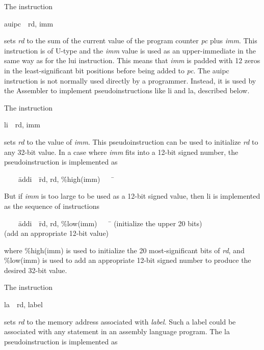 \documentclass[11pt, twoside, pdftex]{article}
\newenvironment{ctabbing}%
{\begin{center}\begin{minipage}{\textwidth}\begin{tabbing}}
{\end{tabbing}\end{minipage}\end{center}}
\begin{document}
The instruction
\vspace{-\baselineskip}
\begin{center}
{\sf auipc~~rd, imm}
\end{center}
\noindent
sets {\it rd} to the sum of the current value of the program counter {\it pc} plus {\it imm}. 
This instruction is of U-type and the {\it imm} value is used as an upper-immediate in the 
same way as for the {\sf lui}
instruction. This means that {\it imm} is padded with 12 zeros in the least-significant bit 
positions before being added to {\it pc}. The {\sf auipc} instruction is not normally used
directly by a programmer. Instead, it is used by the Assembler to implement pseudoinstructions
like {\sf li} and {\sf la}, described below. 

The instruction
\vspace{-\baselineskip}
\begin{center}
{\sf li~~rd, imm}
\end{center}
\noindent
sets {\it rd} to the value of {\it imm}. This pseudoinstruction can be used to initialize
{\it rd} to any 32-bit value. In a case where {\it imm} fits into a 12-bit signed number, 
the pseudoinstruction is implemented as
\vspace{-\baselineskip}
\begin{tabbing}
~~~~\={\sf addi}~~\={\sf rd, rd, \%high(imm)}~~~~\=\kill
{}
\end{tabbing}
\vspace{-\baselineskip}
But if {\it imm} is too large to be used as a 12-bit signed value, then
{\sf li} is implemented as the sequence of instructions

\vspace{-\baselineskip}
\begin{ctabbing}
~~~~\={\sf addi}~~\={\sf rd, rd, \%low(imm)}~~~~\=\kill
{}  \>(initialize the upper 20 bits)\\
  \>(add an appropriate 12-bit value)\\
\end{ctabbing}
\vspace{-\baselineskip}
where {\sf \%high(imm)} is used to initialize the 20 most-significant bits of {\it rd}, and 
{\sf \%low(imm)} is used to add an appropriate 12-bit signed number to produce the desired 
32-bit value.

\noindent
The instruction
\vspace{-\baselineskip}
\begin{center}
{\sf la~~rd, label}
\end{center}
\vspace{-\baselineskip}
\noindent
sets {\it rd} to the memory address associated with {\it label}.  Such a label could be
associated with any statement in an assembly language program. The {\sf la} pseudoinstruction 
is implemented as
\end{document}
